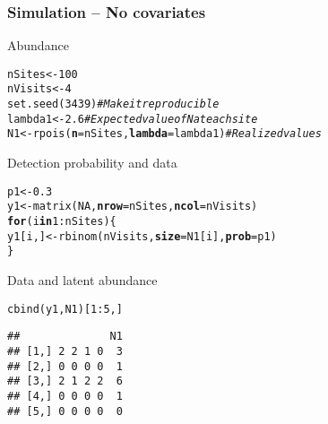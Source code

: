 \documentclass[color=usenames,dvipsnames]{beamer}\usepackage[]{graphicx}\usepackage[]{xcolor}
\makeatletter
\newcommand{\hlnum}[1]{\textcolor[rgb]{0.69,0.494,0}{#1}}%
\newcommand{\hlcom}[1]{\textcolor[rgb]{0.514,0.506,0.514}{\textit{#1}}}%
\newcommand{\hlopt}[1]{\textcolor[rgb]{0,0,0}{#1}}%
\newcommand{\hlstd}[1]{\textcolor[rgb]{0,0,0}{#1}}%
\newcommand{\hlkwa}[1]{\textcolor[rgb]{0,0,0}{\textbf{#1}}}%
\newcommand{\hlkwb}[1]{\textcolor[rgb]{0,0.341,0.682}{#1}}%
\newcommand{\hlkwc}[1]{\textcolor[rgb]{0,0,0}{\textbf{#1}}}%
\newcommand{\hlkwd}[1]{\textcolor[rgb]{0.004,0.004,0.506}{#1}}%
\newenvironment{kframe}{%
 \def\at@end@of@kframe{}%
 \ifinner\ifhmode%
  \def\at@end@of@kframe{\end{minipage}}%
  \begin{minipage}{\columnwidth}%
 \fi\fi%
 \def\FrameCommand##1{\hskip\@totalleftmargin \hskip-\fboxsep
 \colorbox{shadecolor}{##1}\hskip-\fboxsep
     \hskip-\linewidth \hskip-\@totalleftmargin \hskip\columnwidth}%
 \MakeFramed {\advance\hsize-\width
   \@totalleftmargin\z@ \linewidth\hsize
   \@setminipage}}%
 {\par\unskip\endMakeFramed%
 \at@end@of@kframe}
\newenvironment{knitrout}{}{} %
\makeatother
\begin{document}
\begin{frame}[fragile]
  \frametitle{Simulation -- No covariates}
  \small
  Abundance
\begin{knitrout}\scriptsize
{}\color{fgcolor}\begin{kframe}
\begin{alltt}
\hlstd{nSites} \hlkwb{<-} \hlnum{100}
\hlstd{nVisits} \hlkwb{<-} \hlnum{4}
\hlkwd{set.seed}\hlstd{(}\hlnum{3439}\hlstd{)}                         \hlcom{# Make it reproducible}
\hlstd{lambda1} \hlkwb{<-} \hlnum{2.6}                         \hlcom{# Expected value of N at each site}
\hlstd{N1} \hlkwb{<-} \hlkwd{rpois}\hlstd{(}\hlkwc{n}\hlstd{=nSites,} \hlkwc{lambda}\hlstd{=lambda1)}  \hlcom{# Realized values}
\end{alltt}
\end{kframe}
\end{knitrout}
  \pause
  \vfill
  Detection probability and data
\begin{knitrout}\scriptsize
{}\color{fgcolor}\begin{kframe}
\begin{alltt}
\hlstd{p1} \hlkwb{<-} \hlnum{0.3}
\hlstd{y1} \hlkwb{<-} \hlkwd{matrix}\hlstd{(}\hlnum{NA}\hlstd{,} \hlkwc{nrow}\hlstd{=nSites,} \hlkwc{ncol}\hlstd{=nVisits)}
\hlkwa{for}\hlstd{(i} \hlkwa{in} \hlnum{1}\hlopt{:}\hlstd{nSites) \{}
    \hlstd{y1[i,]} \hlkwb{<-} \hlkwd{rbinom}\hlstd{(nVisits,} \hlkwc{size}\hlstd{=N1[i],} \hlkwc{prob}\hlstd{=p1)}
\hlstd{\}}
\end{alltt}
\end{kframe}
\end{knitrout}
  \pause
  \vfill
  Data and latent abundance
\begin{knitrout}\scriptsize
{}\color{fgcolor}\begin{kframe}
\begin{alltt}
\hlkwd{cbind}\hlstd{(y1, N1)[}\hlnum{1}\hlopt{:}\hlnum{5}\hlstd{,]}
\end{alltt}
\begin{verbatim}
##              N1
## [1,] 2 2 1 0  3
## [2,] 0 0 0 0  1
## [3,] 2 1 2 2  6
## [4,] 0 0 0 0  1
## [5,] 0 0 0 0  0
\end{verbatim}
\end{kframe}
\end{knitrout}
\end{frame}
\end{document}

